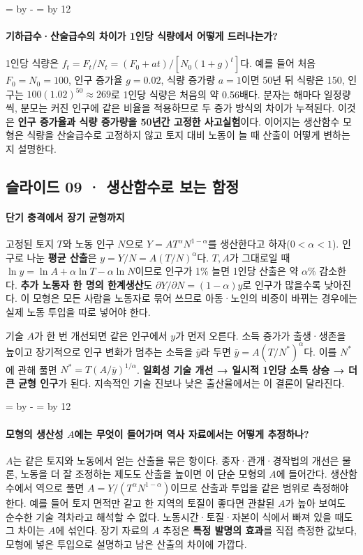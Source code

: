 \documentclass[10pt,a4paper]{article}
\newcommand{\ReserveQuestionSpace}{%
  \par\begingroup
  \dimen0=\pagegoal \advance\dimen0 by -\pagetotal
  \dimen2=\baselineskip \multiply\dimen2 by 12
  \ifdim\dimen0<\dimen2 \newpage\fi
  \endgroup}
\begin{document}
\ReserveQuestionSpace
\paragraph{기하급수·산술급수의 차이가 1인당 식량에서 어떻게 드러나는가?}
1인당 식량은 $f_t=F_t/N_t=(F_0+at)/[N_0(1+g)^t]$다. 예를 들어 처음 $F_0=N_0=100$, 인구 증가율 $g=0.02$, 식량 증가량 $a=1$이면 50년 뒤 식량은 150, 인구는 $100(1.02)^{50}\approx269$로 1인당 식량은 처음의 약 0.56배다. 분자는 해마다 일정량씩, 분모는 커진 인구에 같은 비율을 적용하므로 두 증가 방식의 차이가 누적된다. 이것은 \textbf{인구 증가율과 식량 증가량을 50년간 고정한 사고실험}이다. 이어지는 생산함수 모형은 식량을 산술급수로 고정하지 않고 토지 대비 노동이 늘 때 산출이 어떻게 변하는지 설명한다.\par

\subsection{슬라이드 09 · 생산함수로 보는 함정}
\paragraph{단기 충격에서 장기 균형까지}

고정된 토지 $T$와 노동 인구 $N$으로 $Y=A T^\alpha N^{1-\alpha}$를 생산한다고 하자($0<\alpha<1$). 인구로 나눈 \textbf{평균 산출}은 $y=Y/N=A(T/N)^\alpha$다. $T,A$가 그대로일 때 $\ln y=\ln A+\alpha\ln T-\alpha\ln N$이므로 인구가 1\% 늘면 1인당 산출은 약 $\alpha$\% 감소한다. \textbf{추가 노동자 한 명의 한계생산}도 $\partial Y/\partial N=(1-\alpha)y$로 인구가 많을수록 낮아진다. 이 모형은 모든 사람을 노동자로 묶어 쓰므로 아동·노인의 비중이 바뀌는 경우에는 실제 노동 투입을 따로 넣어야 한다.\par

기술 $A$가 한 번 개선되면 같은 인구에서 $y$가 먼저 오른다. 소득 증가가 출생·생존을 높이고 장기적으로 인구 변화가 멈추는 소득을 $\bar y$라 두면 $\bar y=A(T/N^*)^\alpha$다. 이를 $N^*$에 관해 풀면 $N^*=T(A/\bar y)^{1/\alpha}$. \textbf{일회성 기술 개선 → 일시적 1인당 소득 상승 → 더 큰 균형 인구}가 된다. 지속적인 기술 진보나 낮은 출산율에서는 이 결론이 달라진다.\par

\ReserveQuestionSpace
\paragraph{모형의 생산성 $A$에는 무엇이 들어가며 역사 자료에서는 어떻게 추정하나?}
$A$는 같은 토지와 노동에서 얻는 산출을 묶은 항이다. 종자·관개·경작법의 개선은 물론, 노동을 더 잘 조정하는 제도도 산출을 높이면 이 단순 모형의 $A$에 들어간다. 생산함수에서 역으로 풀면 $A=Y/(T^\alpha N^{1-\alpha})$이므로 산출과 투입을 같은 범위로 측정해야 한다. 예를 들어 토지 면적만 같고 한 지역의 토질이 좋다면 관찰된 $A$가 높아 보여도 순수한 기술 격차라고 해석할 수 없다. 노동시간·토질·자본이 식에서 빠져 있을 때도 그 차이는 $A$에 섞인다. 장기 자료의 $A$ 추정은 \textbf{특정 발명의 효과}를 직접 측정한 값보다, 모형에 넣은 투입으로 설명하고 남은 산출의 차이에 가깝다.\par
\end{document}
